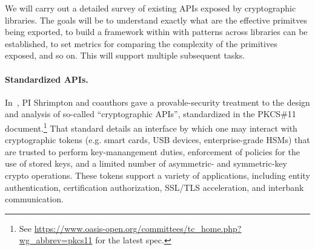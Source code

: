 \begin{task}
  We will carry out a detailed survey of existing APIs exposed by
  cryptographic libraries.  The goals will be to understand exactly
  what are the effective primitves being exported, to build a
  framework within with patterns across libraries can be established,
  to set metrics for comparing the complexity of the primitives
  exposed, and so on.  This will support multiple subsequent
  tasks.
\end{task}

\paragraph{Standardized APIs. }
%
In~\cite{SSW}, PI Shrimpton and coauthors gave a provable-security treatment to
the design and analysis of so-called ``cryptographic APIs'', standardized in the
PKCS\#11 document.\footnote{See
\url{https://www.oasis-open.org/committees/tc_home.php?wg_abbrev=pkcs11} for the
latest spec.} That standard details an interface by which one may interact with
cryptographic tokens (e.g. smart cards, USB devices, enterprise-grade HSMs) that
are trusted to perform key-manangement duties, enforcement of policies for the
use of stored keys, and a limited number of asymmetric- and symmetric-key crypto
operations.  These tokens support a variety of applications, including entity
authentication, certification authorization, SSL/TLS acceleration, and interbank
communication.
%

